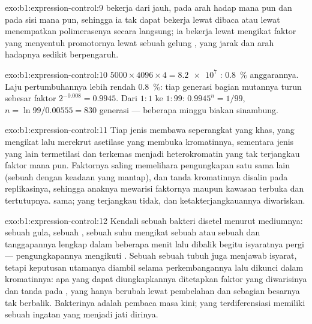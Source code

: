 \begin{solution}{exo:b1:expression-control:9}
 bekerja dari jauh, pada arah hadap mana pun dan pada sisi mana
pun, sehingga ia tak dapat bekerja lewat dibaca atau lewat menempatkan
polimerasenya secara langsung; ia bekerja lewat mengikat faktor yang
menyentuh promotornya lewat sebuah gelung , yang jarak dan arah
hadapnya sedikit berpengaruh.
\end{solution}

\begin{solution}{exo:b1:expression-control:10}
$5000\times 4096\times 4 = \num{8.2e7}$ : \qty{0.8}{\%} anggarannya.
Laju pertumbuhannya lebih rendah \qty{0.8}{\%}: tiap generasi bagian
mutannya turun sebesar faktor $2^{-0.008} = 0.9945$. Dari $1:1$ ke
$1:99$: $0.9945^n = 1/99$, $n = \ln 99/0.00555 = 830$ generasi ---
beberapa minggu biakan sinambung.
\end{solution}

\begin{solution}{exo:b1:expression-control:11}
Tiap jenis  membawa seperangkat  yang khas, yang
mengikat   lalu merekrut asetilase yang membuka
kromatinnya, sementara  jenis yang lain termetilasi dan terkemas
menjadi heterokromatin yang tak terjangkau faktor mana pun. Faktornya
saling memelihara pengungkapan satu sama lain (sebuah  dengan
keadaan yang mantap), dan tanda kromatinnya disalin pada replikasinya,
sehingga anaknya mewarisi faktornya maupun kawasan terbuka dan
tertutupnya.  sama;  yang terjangkau tidak, dan
ketakterjangkauannya diwariskan.
\end{solution}

\begin{solution}{exo:b1:expression-control:12}
Kendali sebuah bakteri disetel menurut mediumnya: sebuah gula, sebuah
, sebuah suhu mengikat sebuah  atau sebuah  dan tanggapannya lengkap dalam beberapa menit lalu dibalik begitu
isyaratnya pergi --- pengungkapannya mengikuti . Sebuah
 sebuah tubuh juga menjawab isyarat, tetapi keputusan utamanya
diambil selama perkembangannya lalu dikunci dalam kromatinnya: apa yang
dapat diungkapkannya ditetapkan faktor yang diwarisinya dan tanda pada
, yang hanya berubah lewat pembelahan dan sebagian besarnya tak
berbalik. Bakterinya adalah pembaca masa kini;  yang terdiferensiasi
memiliki sebuah ingatan yang menjadi jati dirinya.
\end{solution}

